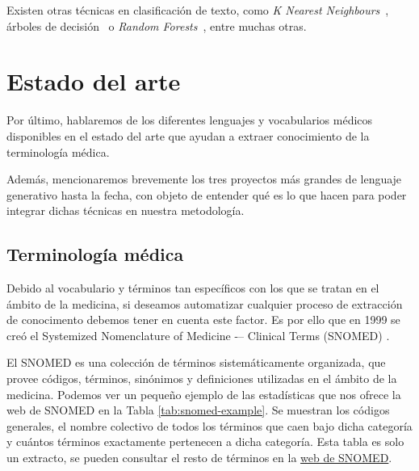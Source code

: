 Existen otras técnicas en clasificación de texto, como \textit{K Nearest Neighbours}~\cite{KNNXiao2007}, árboles de decisión~\cite{DecisionTreeNoorman2018} o \textit{Random Forests}~\cite{breiman2001random}, entre muchas otras. 

\section{Estado del arte}

Por último, hablaremos de los diferentes lenguajes y vocabularios médicos disponibles en el estado del arte que ayudan a extraer conocimiento de la terminología médica.

Además, mencionaremos brevemente los tres proyectos más grandes de lenguaje generativo hasta la fecha, con objeto de entender qué es lo que hacen para poder integrar dichas técnicas en nuestra metodología.

\subsection{Terminología médica}

Debido al vocabulario y términos tan específicos con los que se tratan en el ámbito de la medicina, si deseamos automatizar cualquier proceso de extracción de conocimento debemos tener en cuenta este factor. Es por ello que en 1999 se creó el Systemized Nomenclature of Medicine -– Clinical Terms (SNOMED) \cite{snomed}. 

El SNOMED es una colección de términos sistemáticamente organizada, que provee códigos, términos, sinónimos y definiciones utilizadas en el ámbito de la medicina. Podemos ver un pequeño ejemplo de las estadísticas que nos ofrece la web de SNOMED en la Tabla \ref{tab:snomed-example}. Se muestran los códigos generales, el nombre colectivo de todos los términos que caen bajo dicha categoría y cuántos términos exactamente pertenecen a dicha categoría. Esta tabla es solo un extracto, se pueden consultar el resto de términos en la \href{https://www.nlm.nih.gov/research/umls/sourcereleasedocs/current/SCTSPA/stats.html}{web de SNOMED}.

